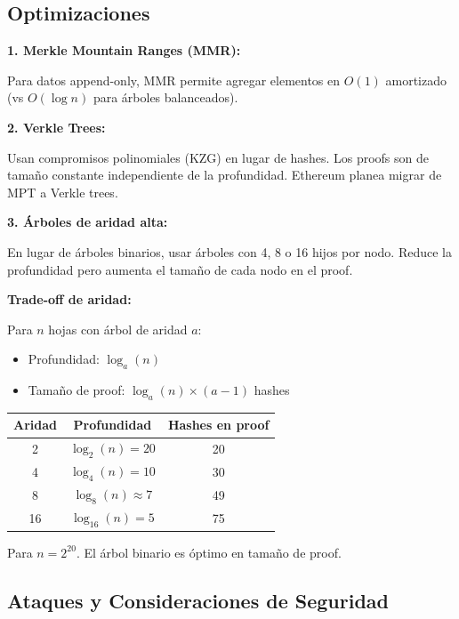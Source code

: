 \documentclass[11pt,a4paper,twoside,openright]{book}
\theoremstyle{definition}
\theoremstyle{plain}
\theoremstyle{remark}
\begin{document}
\subsection{Optimizaciones}

\begin{keyidea}
\textbf{1. Merkle Mountain Ranges (MMR):}

Para datos append-only, MMR permite agregar elementos en $O(1)$ amortizado (vs $O(\log n)$ para árboles balanceados).

\textbf{2. Verkle Trees:}

Usan compromisos polinomiales (KZG) en lugar de hashes. Los proofs son de tamaño constante independiente de la profundidad. Ethereum planea migrar de MPT a Verkle trees.

\textbf{3. Árboles de aridad alta:}

En lugar de árboles binarios, usar árboles con 4, 8 o 16 hijos por nodo. Reduce la profundidad pero aumenta el tamaño de cada nodo en el proof.
\end{keyidea}

\begin{mathnote}
\textbf{Trade-off de aridad:}

Para $n$ hojas con árbol de aridad $a$:
\begin{itemize}
    \item Profundidad: $\log_a(n)$
    \item Tamaño de proof: $\log_a(n) \times (a-1)$ hashes
\end{itemize}

\begin{center}
\begin{tabular}{ccc}
\toprule
\textbf{Aridad} & \textbf{Profundidad} & \textbf{Hashes en proof} \\
\midrule
2 & $\log_2(n) = 20$ & 20 \\
4 & $\log_4(n) = 10$ & 30 \\
8 & $\log_8(n) \approx 7$ & 49 \\
16 & $\log_{16}(n) = 5$ & 75 \\
\bottomrule
\end{tabular}
\end{center}

Para $n = 2^{20}$. El árbol binario es óptimo en tamaño de proof.
\end{mathnote}

\subsection{Ataques y Consideraciones de Seguridad}
\end{document}
